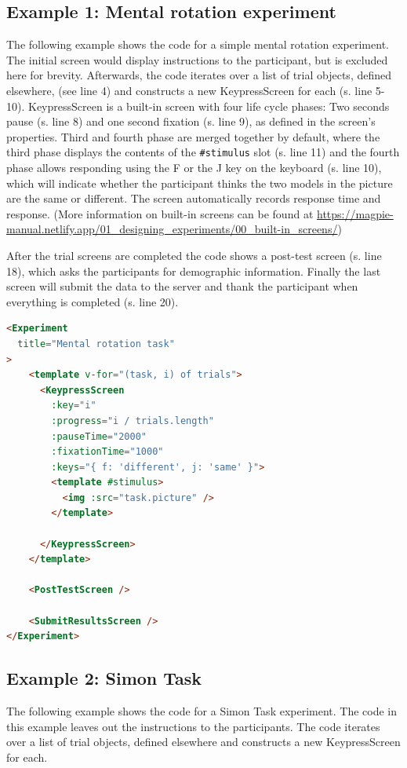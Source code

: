 \documentclass[a4paper,11pt]{scrreprt}
\begin{document}
\subsection{Example 1: Mental rotation experiment}
The following example shows the code for a simple mental rotation experiment. The initial screen would display instructions to the participant, but is excluded here for brevity. Afterwards, the code iterates over a list of trial objects, defined elsewhere, (see line 4) and constructs a new KeypressScreen for each (s. line 5-10). KeypressScreen is a built-in screen with four life cycle phases: Two seconds pause (s. line 8) and one second fixation (s. line 9), as defined in the screen's properties. Third and fourth phase are merged together by default, where the third phase displays the contents of the \texttt{\#stimulus} slot (s. line 11) and the fourth phase allows responding using the F or the J key on the keyboard (s. line 10), which will indicate whether the participant thinks the two models in the picture are the same or different. The screen automatically records response time and response. (More information on built-in screens can be found at \url{https://magpie-manual.netlify.app/01_designing_experiments/00_built-in_screens/})

After the trial screens are completed the code shows a post-test screen (s. line 18), which asks the participants for demographic information. Finally the last screen will submit the data to the server and thank the participant when everything is completed (s. line 20).

\begin{lstlisting}[language=html]
<Experiment
  title="Mental rotation task"
>
    <template v-for="(task, i) of trials">
      <KeypressScreen
        :key="i"
        :progress="i / trials.length"
        :pauseTime="2000"
        :fixationTime="1000"
        :keys="{ f: 'different', j: 'same' }">
        <template #stimulus>
          <img :src="task.picture" />
        </template>
        
      </KeypressScreen>
    </template>

    <PostTestScreen />

    <SubmitResultsScreen />
</Experiment>
\end{lstlisting}


\subsection{Example 2: Simon Task}
The following example shows the code for a Simon Task experiment. The code in this example leaves out the instructions to the participants. The code iterates over a list of trial objects, defined elsewhere and constructs a new KeypressScreen for each.
\end{document}
